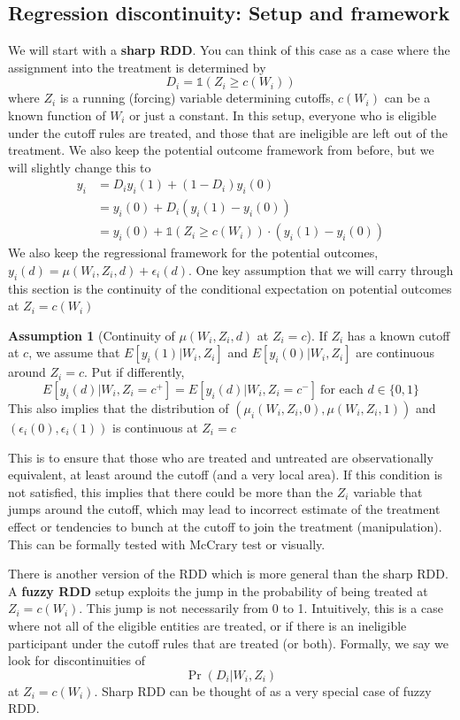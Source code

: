 \documentclass[12pt]{article}
\theoremstyle{definition}
\theoremstyle{property}
\theoremstyle{assumption}
\newtheorem{assumption}{Assumption}[section]
\theoremstyle{example}
\theoremstyle{comment}
\begin{document}
\subsection{Regression discontinuity: Setup and framework}
We will start with a \textbf{sharp RDD}. You can think of this case as a case where the assignment into the treatment is determined by
\[
D_i=\mathbb{1}(Z_i\geq c(W_i))
\]
where $Z_i$ is a running (forcing) variable determining cutoffs, $c(W_i)$ can be a known function of $W_i$ or just a constant. In this setup, everyone who is eligible under the cutoff rules are treated, and those that are ineligible are left out of the treatment. We also keep the potential outcome framework from before, but we will slightly change this to
\begin{align*}
y_i& = D_iy_i(1)+(1-D_i)y_i(0)\\
&=y_i(0)+D_i(y_i(1)-y_i(0))\\
&=y_i(0)+\mathbb{1}(Z_i\geq c(W_i))\cdot(y_i(1)-y_i(0))
\end{align*}
We also keep the regressional framework for the potential outcomes, $y_i(d)=\mu(W_i,Z_i,d)+\epsilon_i(d)$. One key assumption that we will carry through this section is the continuity of the conditional expectation on potential outcomes at $Z_i=c(W_i)$
\begin{mdframed}[backgroundcolor=blue!5] 
\begin{assumption}[Continuity of $\mu(W_i,Z_i,d)$ at $Z_i=c$] If $Z_i$ has a known cutoff at $c$, we assume that $E[y_i(1)|W_i, Z_i]$ and $E[y_i(0)|W_i, Z_i]$ are continuous around $Z_i=c$. Put if differently, 
\[
E[y_i(d)|W_i, Z_i=c^+]=E[y_i(d)|W_i, Z_i=c^-] \  \text{for each } d\in\{0,1\}
\]
This also implies that the distribution of $(\mu_i(W_i, Z_i,0),\mu(W_i, Z_i,1))$ and $(\epsilon_i(0),\epsilon_i(1))$ is continuous at $Z_i=c$
\end{assumption}
\end{mdframed}\par
This is to ensure that those who are treated and untreated are observationally equivalent, at least around the cutoff (and a very local area). If this condition is not satisfied, this implies that there could be more than the $Z_i$ variable that jumps around the cutoff, which may lead to incorrect estimate of the treatment effect or tendencies to bunch at the cutoff to join the treatment (manipulation). This can be formally tested with McCrary test or visually.   \par
There is another version of the RDD which is more general than the sharp RDD. A \textbf{fuzzy RDD} setup exploits the jump in the probability of being treated at $Z_i=c(W_i)$. This jump is not necessarily from 0 to 1. Intuitively, this is a case where not all of the eligible entities are treated, or if there is an ineligible participant under the cutoff rules that are treated (or both). Formally, we say we look for discontinuities of 
\[
\Pr(D_i|W_i,Z_i)
\]
at $Z_i=c(W_i)$. Sharp RDD can be thought of as a very special case of fuzzy RDD.  
\end{document}
